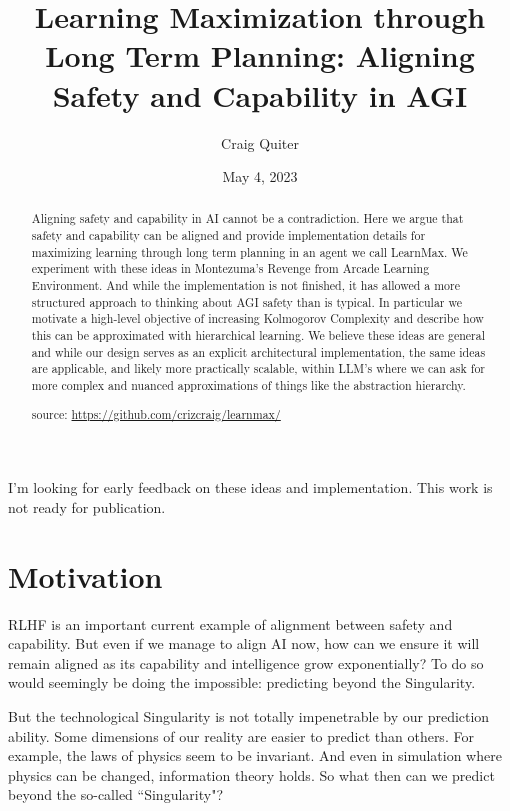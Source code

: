 \documentclass{article}
\title{Learning Maximization through Long Term Planning: Aligning Safety and Capability in AGI}
\author{Craig Quiter}
\date{May 4, 2023}
\begin{document}
\maketitle

\begin{tcolorbox}
I'm looking for early feedback on these ideas and implementation. This work is not ready for publication.
\end{tcolorbox}

\begin{abstract}
Aligning safety and capability in AI cannot be a contradiction.
Here we argue that safety and capability
can be aligned and provide implementation details for maximizing learning through long term planning in an agent we call LearnMax. We experiment with these ideas in Montezuma's Revenge from Arcade Learning Environment. And while the implementation is not finished, it has allowed a more structured approach to thinking about AGI safety than is typical. In particular we motivate a high-level objective of increasing Kolmogorov Complexity and describe how this can be approximated with hierarchical learning. We believe these ideas are general and while our design serves as an explicit architectural implementation, the same ideas are applicable, and likely more practically scalable, within LLM's where we can ask for more complex and nuanced approximations of things like the abstraction hierarchy.

source: \href{https://github.com/crizcraig/learnmax/}{https://github.com/crizcraig/learnmax/}
\end{abstract}

\setcounter{secnumdepth}{-1}

\section{Motivation}
RLHF \cite{christiano2023deep} is an important current example of alignment between safety and capability.
But even if we manage to align AI now, how can we ensure it will remain aligned as its capability and intelligence grow exponentially?
To do so would seemingly be doing the impossible: predicting beyond the Singularity.

But the technological Singularity is not totally impenetrable by our prediction ability.
Some dimensions of our reality are easier to predict than others. For example, the laws of physics
seem to be invariant. And even in simulation where physics can be changed,
information theory holds.
So what then can we predict beyond the so-called \textquotedblleft Singularity"?
\end{document}
